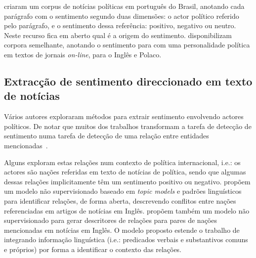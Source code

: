 \documentclass[a4paper, twocolumn, 11pt, twoside]{article}
\begin{document}
\cite{de-arruda-etal-2015-annotated} criaram um corpus de notícias políticas em português do Brasil, anotando cada parágrafo com o sentimento segundo duas dimensões: o actor político referido pelo parágrafo, e o sentimento dessa referência: positivo, negativo ou neutro. Neste recurso fica em aberto qual é a origem do sentimento. \cite{BARANIAK20213627} disponibilizam corpora semelhante, anotando o sentimento para com uma personalidade política em textos de jornais \textit{on-line}, para o Inglês e Polaco.

\subsection{Extracção de sentimento direccionado em texto de notícias}

Vários autores exploraram métodos para extrair sentimento envolvendo actores políticos. De notar que muitos dos trabalhos transformam a tarefa de detecção de sentimento numa tarefa de detecção de uma relação entre entidades mencionadas~\citep{bassignana-plank-2022-mean}.

Alguns exploram estas relações num contexto de política internacional, i.e.: os actores são nações referidas em texto de notícias de política, sendo que algumas dessas relações implicitamente têm um sentimento positivo ou negativo. \cite{oconnor-etal-2013-learning} propõem um modelo não supervisionado baseado em \textit{topic models} e padrões linguísticos para identificar relações, de forma aberta, descrevendo conflitos entre nações referenciadas em artigos de notícias em Inglês. \cite{han-etal-2019-permanent} propõem também um modelo não supervisionado para gerar descritores de relações para pares de nações mencionadas em notícias em Inglês. O modelo proposto estende o trabalho de \cite{iyyer-etal-2016-feuding} integrando informação linguística (i.e.: predicados verbais e substantivos comuns e próprios) por forma a identificar o contexto das relações.
\end{document}
